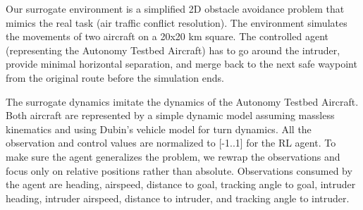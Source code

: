 Our surrogate environment is a simplified 2D obstacle avoidance problem that mimics the real task (air traffic conflict resolution). 
The environment simulates the movements of two aircraft on a 20x20 km square. The controlled agent (representing the Autonomy Testbed Aircraft) has to go around the intruder, provide minimal horizontal separation, and merge back to the next safe waypoint from the original route before the simulation ends.



The surrogate dynamics imitate the dynamics of the Autonomy Testbed Aircraft.
Both aircraft are represented by a simple dynamic model assuming massless kinematics and using Dubin's vehicle model for turn dynamics.
All the observation and control values are normalized to [-1..1] for the RL agent.
To make sure the agent generalizes the problem, we rewrap the observations and focus only on 
relative positions rather than absolute.  Observations consumed by the agent are 
heading, airspeed, distance to goal, tracking angle to goal, 
intruder heading, intruder airspeed, distance to intruder, and tracking angle to intruder.  

